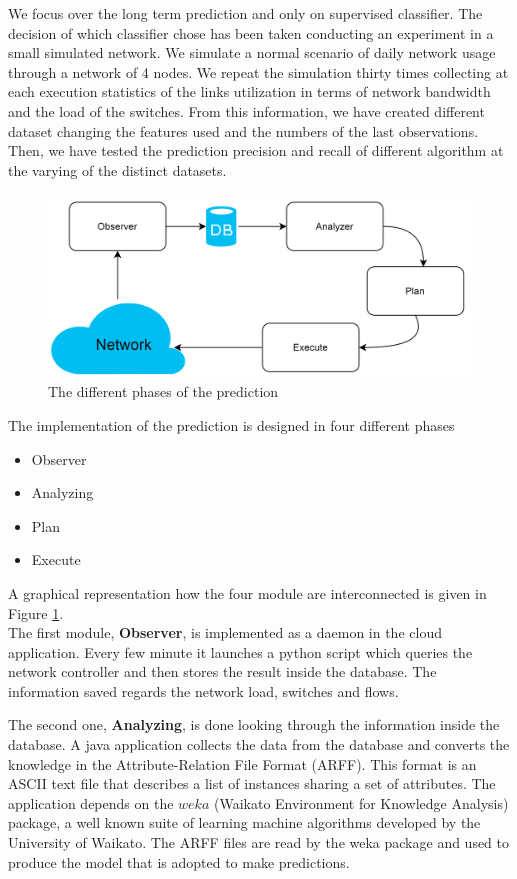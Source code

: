 \documentclass[12pt]{article}
\begin{document}
We focus over the long term prediction and only on supervised classifier.
The decision of which classifier chose has been taken conducting an experiment in a small simulated network. 
We simulate a normal scenario of daily network usage through a network of 4 nodes. 
We repeat the simulation thirty times collecting at each execution statistics of the links utilization in terms of network bandwidth and the load of the switches.
From this information, we have created different dataset changing the features used and the numbers of the last observations.
Then, we have tested the prediction precision and recall of different algorithm at the varying of the distinct datasets. 
\begin{figure}[h!]
	\centering
	\includegraphics[width=1\textwidth]{img/predictionGraph.png}
	\caption[]
	{The different phases of the prediction}
	\label{fig:predictionConf}
\end{figure}


The implementation of the prediction is designed in four different phases
\begin{itemize}
	\item Observer
	\item Analyzing
	\item Plan
	\item Execute
\end{itemize}
A graphical representation how the four module are interconnected is given in Figure \ref{fig:predictionConf}.\\
The first module, \textbf{Observer}, is implemented as a daemon in the cloud application. 
Every few minute it launches a python script which queries the network controller and then stores the result inside the database.
The information saved regards the network load, switches and flows.


The second one, \textbf{Analyzing}, is done looking through the information inside the database. 
A java application collects the data from the database and converts the knowledge in the Attribute-Relation File Format (ARFF). 
This format is an ASCII text file that describes a list of instances sharing a set of attributes.
The application depends on the $weka$ (Waikato Environment for Knowledge Analysis) package, a well known suite of learning machine algorithms developed by the University of Waikato.
The ARFF files are read by the weka package and used to produce the model that is adopted to make predictions.
\end{document}
